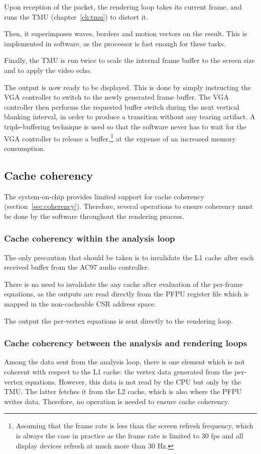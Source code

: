 \documentclass[a4paper,11pt]{kthesis}
\begin{document}
Upon reception of the packet, the rendering loop takes its current frame, and runs the TMU (chapter~\ref{ch:tmu}) to distort it.

Then, it superimposes waves, borders and motion vectors on the result. This is implemented in software, as the processor is fast enough for these tasks.

Finally, the TMU is run twice to scale the internal frame buffer to the screen size and to apply the video echo.

The output is now ready to be displayed. This is done by simply instructing the VGA controller to switch to the newly generated frame buffer. The VGA controller then performs the requested buffer switch during the next vertical blanking interval, in order to produce a transition without any tearing artifact. A triple-buffering technique is used so that the software never has to wait for the VGA controller to release a buffer,\footnote{Assuming that the frame rate is less than the screen refresh frequency, which is always the case in practice as the frame rate is limited to 30 fps and all display devices refresh at much more than 30 Hz.} at the expense of an increased memory consumption.

\subsection{Cache coherency}
The system-on-chip provides limited support for cache coherency (section~\ref{sec:coherency}). Therefore, several operations to ensure coherency must be done by the software throughout the rendering process.

\subsubsection{Cache coherency within the analysis loop}
The only precaution that should be taken is to invalidate the L1 cache after each received buffer from the AC97 audio controller.

There is no need to invalidate the any cache after evaluation of the per-frame equations, as the outputs are read directly from the PFPU register file which is mapped in the non-cacheable CSR address space.

The output the per-vertex equations is sent directly to the rendering loop.

\subsubsection{Cache coherency between the analysis and rendering loops}
Among the data sent from the analysis loop, there is one element which is not coherent with respect to the L1 cache: the vertex data generated from the per-vertex equations. However, this data is not read by the CPU but only by the TMU. The latter fetches it from the L2 cache, which is also where the PFPU writes data. Therefore, no operation is needed to ensure cache coherency.
\end{document}
